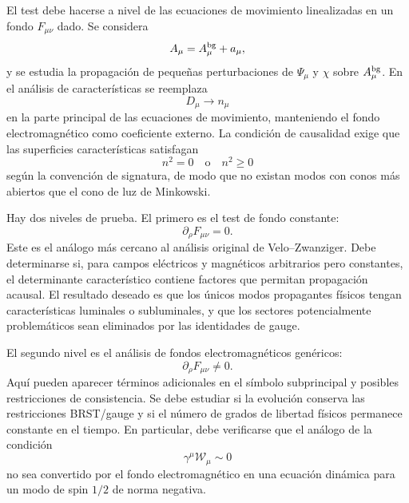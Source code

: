 \documentclass[11pt,a4paper]{article}
\numberwithin{equation}{section}
\newcommand{\Wcal}{\mathcal W}
\begin{document}
El test debe hacerse a nivel de las ecuaciones de movimiento linealizadas en un fondo
$F_{\mu\nu}$ dado. Se considera
\begin{equation}
  A_\mu=A_\mu^{\rm bg}+a_\mu,
\end{equation}
y se estudia la propagación de pequeñas perturbaciones de $\Psi_\mu$ y $\chi$ sobre
$A_\mu^{\rm bg}$. En el análisis de características se reemplaza
\begin{equation}
  D_\mu \longrightarrow n_\mu
\end{equation}
en la parte principal de las ecuaciones de movimiento, manteniendo el fondo
electromagnético como coeficiente externo. La condición de causalidad exige que las
superficies características satisfagan
\begin{equation}
  n^2=0
  \quad \text{o} \quad
  n^2\geq 0
\end{equation}
según la convención de signatura, de modo que no existan modos con conos más abiertos
que el cono de luz de Minkowski.

Hay dos niveles de prueba. El primero es el test de fondo constante:
\begin{equation}
  \partial_\rho F_{\mu\nu}=0.
\end{equation}
Este es el análogo más cercano al análisis original de Velo--Zwanziger. Debe determinarse
si, para campos eléctricos y magnéticos arbitrarios pero constantes, el determinante
característico contiene factores que permitan propagación acausal. El resultado deseado
es que los únicos modos propagantes físicos tengan características luminales o
subluminales, y que los sectores potencialmente problemáticos sean eliminados por las
identidades de gauge.

El segundo nivel es el análisis de fondos electromagnéticos genéricos:
\begin{equation}
  \partial_\rho F_{\mu\nu}\neq 0.
\end{equation}
Aquí pueden aparecer términos adicionales en el símbolo subprincipal y posibles
restricciones de consistencia. Se debe estudiar si la evolución conserva las restricciones
BRST/gauge y si el número de grados de libertad físicos permanece constante en el
tiempo. En particular, debe verificarse que el análogo de la condición
\begin{equation}
  \gamma^\mu\Wcal_\mu \sim 0
\end{equation}
no sea convertido por el fondo electromagnético en una ecuación dinámica para un modo
de spin $1/2$ de norma negativa.
\end{document}
